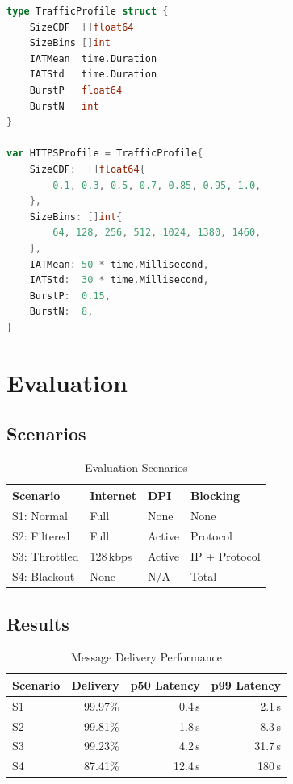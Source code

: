 \documentclass[11pt,a4paper]{article}
\begin{document}
\begin{lstlisting}[language=Go,caption={Traffic Shaping Engine}]
type TrafficProfile struct {
    SizeCDF  []float64
    SizeBins []int
    IATMean  time.Duration
    IATStd   time.Duration
    BurstP   float64
    BurstN   int
}

var HTTPSProfile = TrafficProfile{
    SizeCDF:  []float64{
        0.1, 0.3, 0.5, 0.7, 0.85, 0.95, 1.0,
    },
    SizeBins: []int{
        64, 128, 256, 512, 1024, 1380, 1460,
    },
    IATMean: 50 * time.Millisecond,
    IATStd:  30 * time.Millisecond,
    BurstP:  0.15,
    BurstN:  8,
}
\end{lstlisting}

\section{Evaluation}
\label{sec:evaluation}

\subsection{Scenarios}

\begin{table}[h]
\centering
\caption{Evaluation Scenarios}
\label{tab:scenarios}
\begin{tabular}{@{}llll@{}}
\toprule
\textbf{Scenario} & \textbf{Internet} & \textbf{DPI}    & \textbf{Blocking} \\
\midrule
S1: Normal   & Full       & None   & None \\
S2: Filtered & Full       & Active & Protocol \\
S3: Throttled& 128\,kbps  & Active & IP + Protocol \\
S4: Blackout & None       & N/A    & Total \\
\bottomrule
\end{tabular}
\end{table}

\subsection{Results}

\begin{table}[h]
\centering
\caption{Message Delivery Performance}
\label{tab:delivery}
\begin{tabular}{@{}lrrr@{}}
\toprule
\textbf{Scenario} & \textbf{Delivery} & \textbf{p50 Latency} & \textbf{p99 Latency} \\
\midrule
S1 & 99.97\% &  0.4\,s &   2.1\,s \\
S2 & 99.81\% &  1.8\,s &   8.3\,s \\
S3 & 99.23\% &  4.2\,s &  31.7\,s \\
S4 & 87.41\% & 12.4\,s & 180\,s   \\
\bottomrule
\end{tabular}
\end{table}
\end{document}
